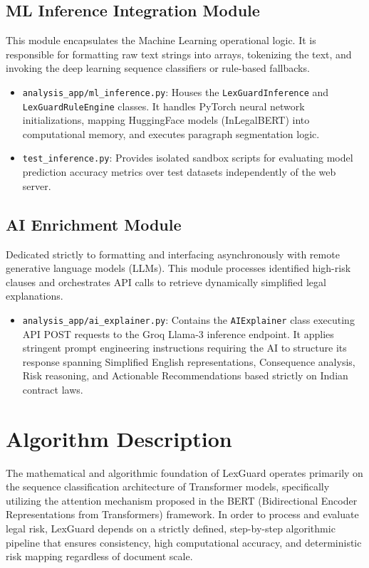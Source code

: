 \documentclass[a4paper,12pt]{report}
\begin{document}
\subsection{ML Inference Integration Module}
This module encapsulates the Machine Learning operational logic. It is responsible for formatting raw text strings into arrays, tokenizing the text, and invoking the deep learning sequence classifiers or rule-based fallbacks.
\begin{itemize}
    \item \texttt{analysis\_app/ml\_inference.py}: Houses the \texttt{LexGuardInference} and \texttt{LexGuardRuleEngine} classes. It handles PyTorch neural network initializations, mapping HuggingFace models (InLegalBERT) into computational memory, and executes paragraph segmentation logic.
    \item \texttt{test\_inference.py}: Provides isolated sandbox scripts for evaluating model prediction accuracy metrics over test datasets independently of the web server.
\end{itemize}

\subsection{AI Enrichment Module}
Dedicated strictly to formatting and interfacing asynchronously with remote generative language models (LLMs). This module processes identified high-risk clauses and orchestrates API calls to retrieve dynamically simplified legal explanations.
\begin{itemize}
    \item \texttt{analysis\_app/ai\_explainer.py}: Contains the \texttt{AIExplainer} class executing API POST requests to the Groq Llama-3 inference endpoint. It applies stringent prompt engineering instructions requiring the AI to structure its response spanning Simplified English representations, Consequence analysis, Risk reasoning, and Actionable Recommendations based strictly on Indian contract laws.
\end{itemize}

\section{Algorithm Description}

The mathematical and algorithmic foundation of LexGuard operates primarily on the sequence classification architecture of Transformer models, specifically utilizing the attention mechanism proposed in the BERT (Bidirectional Encoder Representations from Transformers) framework. In order to process and evaluate legal risk, LexGuard depends on a strictly defined, step-by-step algorithmic pipeline that ensures consistency, high computational accuracy, and deterministic risk mapping regardless of document scale.
\end{document}
